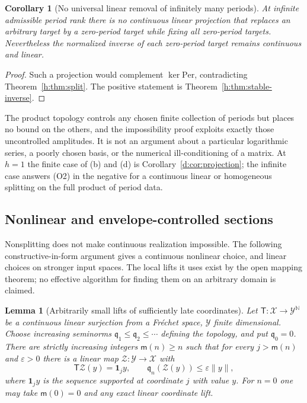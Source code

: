 \documentclass[11pt,a4paper]{article}
\numberwithin{equation}{section}
\newtheorem{lemma}[theorem]{Lemma}
\newtheorem{corollary}[theorem]{Corollary}
\theoremstyle{definition}
\theoremstyle{remark}
\theoremstyle{plain}
\newcommand{\Per}{\mathrm{Per}}
\newcommand{\norm}[1]{\lVert #1\rVert}
\begin{document}
\begin{corollary}[No universal linear removal of infinitely many periods]
\label{h:cor:no-removal}
At infinite admissible period rank there is no continuous linear projection
that replaces an arbitrary target by a zero-period target while fixing all
zero-period targets. Nevertheless the normalized inverse of each zero-period
target remains continuous and linear.
\end{corollary}

\begin{proof}
Such a projection would complement $\ker\Per$, contradicting
Theorem~\ref{h:thm:split}. The positive statement is
Theorem~\ref{h:thm:stable-inverse}.
\end{proof}

The product topology controls any chosen finite collection of periods but
places no bound on the others, and the impossibility proof exploits exactly
those uncontrolled amplitudes. It is not an argument about a particular
logarithmic series, a poorly chosen basis, or the numerical ill-conditioning of
a matrix. At $h=1$ the finite case of (b) and (d) is
Corollary~\ref{d:cor:projection}; the infinite case answers (O2) in the
negative for a continuous linear or homogeneous splitting on the full product
of period data.

\subsection{Nonlinear and envelope-controlled sections}
\label{h:sec:selection}

Nonsplitting does not make continuous realization impossible. The following
constructive-in-form argument gives a continuous nonlinear choice, and linear
choices on stronger input spaces. The local lifts it uses exist by the open
mapping theorem; no effective algorithm for finding them on an arbitrary domain
is claimed.

\begin{lemma}[Arbitrarily small lifts of sufficiently late coordinates]
\label{h:lem:small-lifts}
Let $\mathsf T:\mathcal X\to\mathcal Y^{\mathbb N}$ be a continuous linear
surjection from a Fr\'echet space, $\mathcal Y$ finite dimensional. Choose
increasing seminorms $\mathfrak q_1\le\mathfrak q_2\le\cdots$ defining the
topology, and put $\mathfrak q_0=0$. There are strictly increasing integers
$\mathsf m(n)\ge n$ such that for every $j>\mathsf m(n)$ and $\varepsilon>0$
there is a linear map $\mathcal Z:\mathcal Y\to\mathcal X$ with
\begin{equation}\label{h:eq:small-lift}
 \mathsf T\mathcal Z(y)=\mathbf 1_jy,\qquad
 \mathfrak q_n(\mathcal Z(y))\le\varepsilon\norm y,
\end{equation}
where $\mathbf 1_jy$ is the sequence supported at coordinate $j$ with value $y$.
For $n=0$ one may take $\mathsf m(0)=0$ and any exact linear coordinate lift.
\end{lemma}
\end{document}
